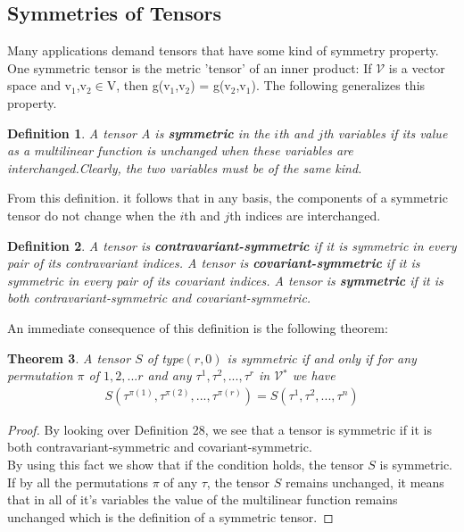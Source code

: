 \documentclass[12pt,a4paper]{article}
\newtheorem{thm}{Theorem}
\newtheorem{defn}[thm]{Definition}
\begin{document}
\subsection{Symmetries of Tensors}
Many applications demand tensors that have some kind of symmetry property. One symmetric tensor is the metric 'tensor' of an inner product: If $\mathcal{V}$ is a vector space  and v$_1$,v$_2$$\in$V, then g(v$_1$,v$_2$) = g(v$_2$,v$_1$). The following generalizes this property.\\
\begin{defn}
A tensor A is \textbf{symmetric} in the $i$th and $j$th variables if its value as a multilinear function is unchanged when these variables are interchanged.Clearly, the two variables must be of the same kind.
\end{defn}
\hspace{1cm} From this definition. it follows that in any basis, the components of a symmetric tensor do not change when the $i$th and $j$th indices are interchanged.
\begin{defn}
A tensor is \textbf{contravariant-symmetric} if it is symmetric in every pair of its contravariant indices. A tensor is \textbf{covariant-symmetric} if it is symmetric in every pair of its covariant indices. A tensor is \textbf{symmetric} if it is both contravariant-symmetric and covariant-symmetric.
\end{defn}
\hspace{1cm} An immediate consequence of this definition is the following theorem:
\begin{thm}
A tensor $S$ of type$(r,0)$ is symmetric if and only if for any permutation $\pi$ of $1,2,...r$ and any $\tau^1,\tau^2,...,\tau^r$ in $\mathcal{V}$$^*$ we have \begin{align*}
S(\tau^{\pi(1)},\tau^{\pi(2)},...,\tau^{\pi(r)}) = S(\tau^1,\tau^2,...,\tau^n)
\end{align*}
\end{thm}
\begin{proof}
By looking over Definition 28, we see that a tensor is symmetric if it is both contravariant-symmetric and covariant-symmetric. \\
By using this fact we show that if the condition holds, the tensor $S$ is symmetric.\\
If by all the permutations $\pi$ of any $\tau$, the tensor $S$ remains unchanged, it means that in all of it's variables the value of the multilinear function remains unchanged which is the definition of a symmetric tensor.
\end{proof}
$$
\end{document}
